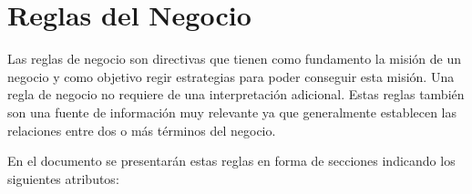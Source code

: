 \chapter{Reglas del Negocio}
\label{cap:reglasNegocio}

Las reglas de negocio son directivas que tienen como fundamento la misión de un negocio y como objetivo regir estrategias para poder conseguir esta misión. Una regla de negocio no requiere de una interpretación adicional. Estas reglas también son una fuente de información muy relevante ya que generalmente establecen las relaciones entre dos o más términos del negocio.

En el documento se presentarán estas reglas en forma de secciones indicando los siguientes atributos:

